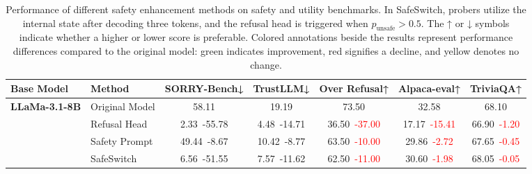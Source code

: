 


\begin{table*}[hbtp]
\caption{Performance of different safety enhancement methods on safety and utility benchmarks. In SafeSwitch, probers utilize the internal state after decoding three tokens, and the refusal head is triggered when $p_{\text{unsafe}}>0.5$. The ↑ or ↓ symbols indicate whether a higher or lower score is preferable. Colored annotations beside the results represent performance differences compared to the original model: green indicates improvement, red signifies a decline, and yellow denotes no change.}
\label{table:result}
\small
\vspace{2mm}
\centering
\renewcommand{\arraystretch}{1.1}
\begin{tabular}{llccccc}
\toprule
Base Model & Method & \multicolumn{1}{l}{SORRY-Bench↓} & \multicolumn{1}{l}{TrustLLM↓} & \multicolumn{1}{l}{Over Refusal↑} & \multicolumn{1}{l}{Alpaca-eval↑} & \multicolumn{1}{l}{TriviaQA↑} \\
\midrule
\multicolumn{1}{c}{\multirow{4}{*}{\textbf{LLaMa-3.1-8B}}} & Original Model & 58.11 & 19.19 & 73.50 & 32.58 & 68.10 \\
\multicolumn{1}{c}{} & Refusal Head & 2.33\tiny{\textcolor[HTML]{206546}{\ -55.78}} & 4.48\tiny{\textcolor[HTML]{206546}{\ -14.71}} & 36.50\tiny{\textcolor{red}{\ -37.00}} & 17.17\tiny{\textcolor{red}{\ -15.41}} & 66.90\tiny{\textcolor{red}{\ -1.20}} \\
\multicolumn{1}{c}{} & Safety Prompt & 49.44\tiny{\textcolor[HTML]{206546}{\ -8.67}} & 10.42\tiny{\textcolor[HTML]{206546}{\ -8.77}} & 63.50\tiny{\textcolor{red}{\ -10.00}} & 29.86\tiny{\textcolor{red}{\ -2.72}} & 67.65\tiny{\textcolor{red}{\ -0.45}} \\
\multicolumn{1}{c}{} & SafeSwitch & 6.56\tiny{\textcolor[HTML]{206546}{\ -51.55}} & 7.57\tiny{\textcolor[HTML]{206546}{\ -11.62}} & 62.50\tiny{\textcolor{red}{\ -11.00}} & 30.60\tiny{\textcolor{red}{\ -1.98}} & 68.05\tiny{\textcolor{red}{\ -0.05}} \\

\end{tabular}
\end{table*}
